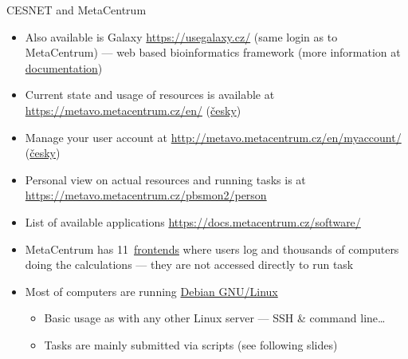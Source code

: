 \documentclass[compress, xelatex, 11pt, xcolor=svgnames, aspectratio=169,
	hyperref={
		bookmarks=true,
		unicode=true,
		colorlinks=true,
		pdftitle={Linux, command line and MetaCentrum},
		plainpages=false,
		pdfauthor={Vojtech Zeisek},
		pdfsubject={Course about use of Linux command line, writing shell scripts and using MetaCentrum of CESNET},
		pdfcreator={XeLaTeX},
		pdfkeywords={Linux, GNU, BASH, shell, command line, MetaCentrum},
		linkcolor=DarkRed, %
		anchorcolor=DarkBlue, %
		citecolor=Indigo, %
		filecolor=NavyBlue, %
		menucolor=DarkMagenta, %
		urlcolor=DarkBlue, %
		},
	url={hyphens, lowtilde} %
	]{beamer}
\begin{document}
\begin{frame}[allowframebreaks]{CESNET and MetaCentrum}
\begin{itemize}
		\item Also available is Galaxy \url{https://usegalaxy.cz/} (same login as to MetaCentrum) --- web based bioinformatics framework (more information at \href{https://docs.metacentrum.cz/related/galaxy/}{documentation})
		\item Current state and usage of resources is available at \url{https://metavo.metacentrum.cz/en/} (\href{https://metavo.metacentrum.cz/cs/}{česky})
		\item Manage your user account at \url{http://metavo.metacentrum.cz/en/myaccount/} (\href{https://metavo.metacentrum.cz/cs/myaccount/}{česky})
		\item Personal view on actual resources and running tasks is at \url{https://metavo.metacentrum.cz/pbsmon2/person}
		\item List of available applications \url{https://docs.metacentrum.cz/software/}
		\item MetaCentrum has 11~\href{https://docs.metacentrum.cz/computing/infrastructure/frontends/}{frontends} where users log and thousands of computers doing the calculations --- they are not accessed directly to run task
		\item Most of computers are running \href{https://www.debian.org/}{Debian GNU/Linux}
		\begin{itemize}
			\item Basic usage as with any other Linux server --- SSH \& command line\ldots
			\item Tasks are mainly submitted via scripts (see following slides)
		\end{itemize}
	\end{itemize}
\end{frame}
\end{document}
